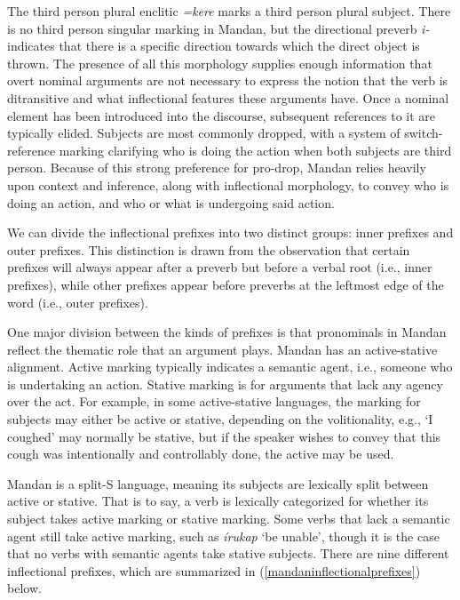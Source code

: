 The third person plural enclitic \textit{=kere} marks a third person plural subject. There is no third person singular marking in Mandan, but the directional preverb \textit{i-} indicates that there is a specific direction towards which the direct object is thrown. The presence of all this morphology supplies enough information that overt nominal arguments are not necessary to express the notion that the verb is ditransitive and what inflectional features these arguments have. Once a nominal element has been introduced into the discourse, subsequent references to it are typically elided. Subjects are most commonly dropped, with a system of switch-reference marking clarifying who is doing the action when both subjects are third person. Because of this strong preference for {pro}-drop, Mandan relies heavily upon context and inference, along with inflectional morphology, to convey who is doing an action, and who or what is undergoing said action.

We can divide the inflectional prefixes into two distinct groups: inner prefixes and outer prefixes. This distinction is drawn from the observation that certain prefixes will always appear after a preverb but before a verbal root (i.e., inner prefixes), while other prefixes appear before preverbs at the leftmost edge of the word (i.e., outer prefixes).

One major division between the kinds of prefixes is that pronominals in Mandan reflect the thematic role that an argument plays. Mandan has an active-stative alignment. Active marking typically indicates a semantic agent, i.e., someone who is undertaking an action. Stative marking is for arguments that lack any agency over the act. For example,  in some active-stative languages, the marking for subjects may either be active or stative, depending on the volitionality, e.g., `I coughed' may normally be stative, but if the speaker wishes to convey that this cough was intentionally and controllably done, the active may be used. 

Mandan is a split-S language, meaning its subjects are lexically split between active or stative. That is to say, a verb is lexically categorized for whether its subject takes active marking or stative marking. Some verbs that lack a semantic agent still take active marking, such as \textit{írukap} `be unable', though it is the case that no verbs with semantic agents take stative subjects. There are nine different inflectional prefixes, which are summarized in (\ref{mandaninflectionalprefixes}) below.

